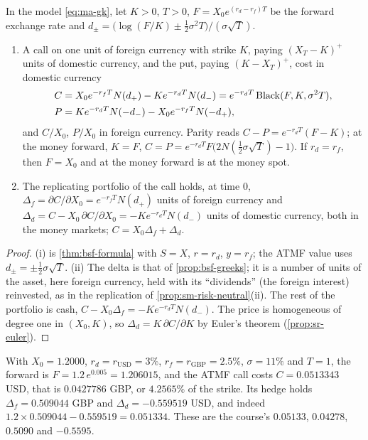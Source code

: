 \begin{proposition}\label{prop:ma-garman-kohlhagen}
In the model \eqref{eq:ma-gk}, let $K>0$, $T>0$, $F=X_0e^{(r_d-r_f)T}$ be the forward
exchange rate and $d_\pm=\big(\log(F/K)\pm\frac12\sigma^2T\big)/(\sigma\sqrt T)$.
\begin{enumerate}[label=(\roman*)]
  \item A call on one unit of foreign currency with strike $K$, paying $(X_T-K)^+$ units of
    domestic currency, and the put, paying $(K-X_T)^+$, cost in domestic currency
    \begin{align*}
      C&=X_0e^{-r_fT}N(d_+)-Ke^{-r_dT}N(d_-)=e^{-r_dT}\operatorname{Black}(F,K,\sigma^2T),\\
      P&=Ke^{-r_dT}N(-d_-)-X_0e^{-r_fT}N(-d_+),
    \end{align*}
    and $C/X_0$, $P/X_0$ in foreign currency. Parity reads $C-P=e^{-r_dT}(F-K)$; at the
    money forward, $K=F$, $C=P=e^{-r_dT}F\big(2N(\frac12\sigma\sqrt T)-1\big)$. If $r_d=r_f$, then
    $F=X_0$ and at the money forward is at the money spot.
  \item The replicating portfolio of the call holds, at time $0$,
    $\Delta_f=\partial C/\partial X_0=e^{-r_fT}N(d_+)$ units of foreign currency and
    $\Delta_d=C-X_0\,\partial C/\partial X_0=-Ke^{-r_dT}N(d_-)$ units of domestic currency, both
    in the money markets; $C=X_0\Delta_f+\Delta_d$.
\end{enumerate}
\end{proposition}

\begin{proof}
(i) is \cref{thm:bsf-formula} with $S=X$, $r=r_d$, $y=r_f$; the ATMF value uses $d_\pm=\pm\frac12\sigma\sqrt T$.
(ii) The delta is that of \cref{prop:bsf-greeks}; it is a number of units of the asset, here
foreign currency, held with its ``dividends'' (the foreign interest) reinvested, as in the
replication of \cref{prop:sm-risk-neutral}(ii). The rest of the portfolio is cash,
$C-X_0\Delta_f=-Ke^{-r_dT}N(d_-)$. The price is homogeneous of degree one in $(X_0,K)$, so
$\Delta_d=K\,\partial C/\partial K$ by Euler's theorem (\cref{prop:sr-euler}).
\end{proof}

\begin{example}\label{exa:ma-cable}
With $X_0=1.2000$, $r_d=r_{\mathrm{USD}}=3\%$, $r_f=r_{\mathrm{GBP}}=2.5\%$, $\sigma=11\%$ and $T=1$, the forward
is $F=1.2\,e^{0.005}=1.206015$, and the ATMF call costs $C=0.0513343$ USD, that is
$0.0427786$ GBP, or $4.2565\%$ of the strike. Its hedge holds $\Delta_f=0.509044$ GBP and
$\Delta_d=-0.559519$ USD, and indeed $1.2\times0.509044-0.559519=0.051334$. These are the
course's $0.05133$, $0.04278$, $0.5090$ and $-0.5595$.
\end{example}

